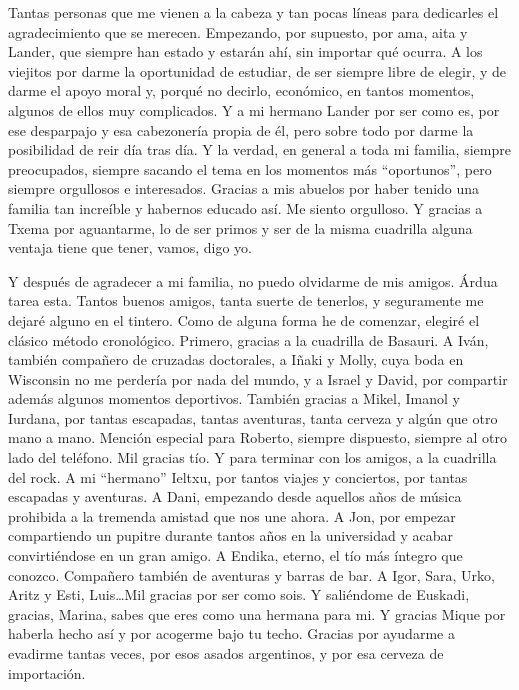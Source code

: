 
\begin{acknowledgementslong} 

Tantas personas que me vienen a la cabeza y tan pocas líneas para dedicarles
el agradecimiento que se merecen. Empezando, por supuesto, por ama, aita y Lander,
que siempre han estado y estarán ahí, sin importar qué ocurra. A los viejitos
por darme la oportunidad de estudiar, de ser siempre libre de elegir, y de darme
el apoyo moral y, porqué no decirlo, económico, en tantos momentos, algunos de
ellos muy complicados. Y a mi hermano Lander por ser como es, por ese desparpajo
y esa cabezonería propia de él, pero sobre todo por darme la posibilidad de reir
día tras día. Y la verdad, en general a toda mi familia, siempre preocupados,
siempre sacando el tema en los momentos más ``oportunos'', pero siempre orgullosos
e interesados. Gracias a mis abuelos por haber tenido una familia tan increíble
y habernos educado así. Me siento orgulloso. Y gracias a Txema por aguantarme,
lo de ser primos y ser de la misma cuadrilla alguna ventaja tiene que tener,
vamos, digo yo.

Y después de agradecer a mi familia, no puedo olvidarme de mis amigos. Árdua
tarea esta. Tantos buenos amigos, tanta suerte de tenerlos, y seguramente me
dejaré alguno en el tintero. Como de alguna forma he de comenzar, elegiré el
clásico método cronológico. Primero, gracias a la cuadrilla de Basauri. A Iván,
también compañero de cruzadas doctorales, a Iñaki y Molly, cuya boda en Wisconsin
no me perdería por nada del mundo, y a Israel y David, por compartir además algunos
momentos deportivos. También gracias a Mikel, Imanol y Iurdana, por tantas
escapadas, tantas aventuras, tanta cerveza y algún que otro mano a mano. Mención
especial para Roberto, siempre dispuesto, siempre al otro lado del teléfono. Mil
gracias tío. Y para terminar con los amigos, a la cuadrilla del rock. A mi 
``hermano'' Ieltxu, por tantos viajes y conciertos, por tantas escapadas y 
aventuras. A Dani, empezando desde aquellos años de música prohibida a la tremenda 
amistad que nos une ahora. A Jon, por empezar compartiendo un pupitre durante 
tantos años en la universidad y acabar convirtiéndose en un gran amigo. A Endika, 
eterno, el tío más íntegro que conozco. Compañero también de aventuras y barras 
de bar. A Igor, Sara, Urko, Aritz y Esti, Luis\dots Mil gracias por ser como sois. 
Y saliéndome de Euskadi, gracias, Marina, sabes que eres como una hermana
para mi. Y gracias Mique por haberla hecho así y por acogerme bajo tu techo. 
Gracias por ayudarme a evadirme tantas veces, por esos asados argentinos, y por 
esa cerveza de importación.


\end{acknowledgementslong}
